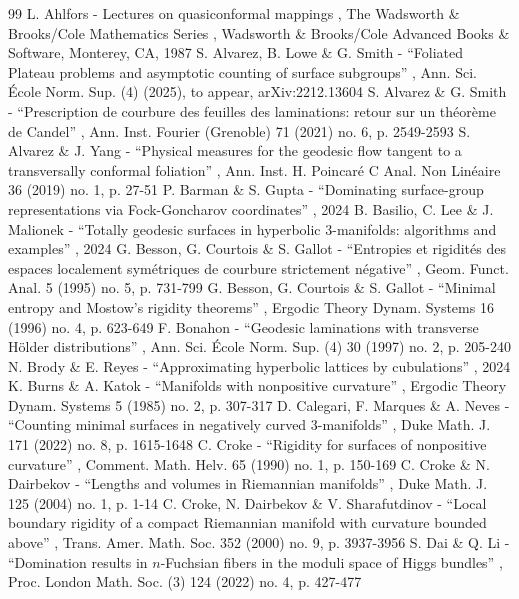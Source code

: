 \begin{thebibliography}{99}
 L. Ahlfors - Lectures on quasiconformal mappings , The Wadsworth \& Brooks/Cole Mathematics Series , Wadsworth \& Brooks/Cole Advanced Books \& Software, Monterey, CA, 1987
 S. Alvarez, B. Lowe \& G. Smith - “Foliated Plateau problems and asymptotic counting of surface subgroups” , Ann. Sci. École Norm. Sup. (4) (2025), to appear, arXiv:2212.13604
 S. Alvarez \& G. Smith - “Prescription de courbure des feuilles des laminations: retour sur un théorème de Candel” , Ann. Inst. Fourier (Grenoble) 71 (2021) no. 6, p. 2549-2593
 S. Alvarez \& J. Yang - “Physical measures for the geodesic flow tangent to a transversally conformal foliation” , Ann. Inst. H. Poincaré C Anal. Non Linéaire 36 (2019) no. 1, p. 27-51
 P. Barman \& S. Gupta - “Dominating surface-group representations via Fock-Goncharov coordinates” , 2024
 B. Basilio, C. Lee \& J. Malionek - “Totally geodesic surfaces in hyperbolic 3-manifolds: algorithms and examples” , 2024
 G. Besson, G. Courtois \& S. Gallot - “Entropies et rigidités des espaces localement symétriques de courbure strictement négative” , Geom. Funct. Anal. 5 (1995) no. 5, p. 731-799
 G. Besson, G. Courtois \& S. Gallot - “Minimal entropy and Mostow’s rigidity theorems” , Ergodic Theory Dynam. Systems 16 (1996) no. 4, p. 623-649
 F. Bonahon - “Geodesic laminations with transverse Hölder distributions” , Ann. Sci. École Norm. Sup. (4) 30 (1997) no. 2, p. 205-240
 N. Brody \& E. Reyes - “Approximating hyperbolic lattices by cubulations” , 2024
 K. Burns \& A. Katok - “Manifolds with nonpositive curvature” , Ergodic Theory Dynam. Systems 5 (1985) no. 2, p. 307-317
 D. Calegari, F. Marques \& A. Neves - “Counting minimal surfaces in negatively curved 3-manifolds” , Duke Math. J. 171 (2022) no. 8, p. 1615-1648
 C. Croke - “Rigidity for surfaces of nonpositive curvature” , Comment. Math. Helv. 65 (1990) no. 1, p. 150-169
 C. Croke \& N. Dairbekov - “Lengths and volumes in Riemannian manifolds” , Duke Math. J. 125 (2004) no. 1, p. 1-14
 C. Croke, N. Dairbekov \& V. Sharafutdinov - “Local boundary rigidity of a compact Riemannian manifold with curvature bounded above” , Trans. Amer. Math. Soc. 352 (2000) no. 9, p. 3937-3956
 S. Dai \& Q. Li - “Domination results in $n$-Fuchsian fibers in the moduli space of Higgs bundles” , Proc. London Math. Soc. (3) 124 (2022) no. 4, p. 427-477

\end{thebibliography}
